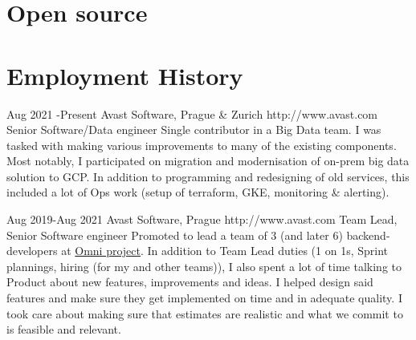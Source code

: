 \documentclass[10pt]{article} %
\begin{document}


    \section{Open source}



    \section{Employment History}

    \job
    {Aug 2021 -}{Present}
    {Avast Software, Prague \& Zurich}
    {http://www.avast.com}
    {Senior Software/Data engineer}
    {Single contributor in a Big Data team. I was tasked with making various improvements
    to many of the existing components. Most notably, I participated on migration and modernisation of on-prem big data solution to GCP. In addition to programming and redesigning of old services, this included a lot of Ops work (setup of terraform, GKE, monitoring \& alerting).\\

    }


    \job
    {Aug 2019-}{Aug 2021}
    {Avast Software, Prague}
    {http://www.avast.com}
    {Team Lead, Senior Software engineer}
    {Promoted to lead a team of 3 (and later 6) backend-developers at \href{https://www.avast.com/en-us/omni}{Omni project}. In addition to Team Lead duties (1 on 1s, Sprint plannings, hiring (for my and other teams)), I also spent a lot of time talking to Product about new features, improvements and ideas. I helped design said features and make sure they get implemented on time and in adequate quality. I took care about making sure that estimates are realistic and what we commit to is feasible and relevant. \\

    }
\end{document}
